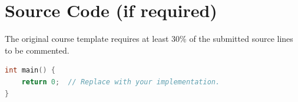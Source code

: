 \section{Source Code (if required)}

The original course template requires at least 30\% of the submitted source
lines to be commented.

% 

\begin{lstlisting}[language=C++,caption={Code example}]
int main() {
    return 0;  // Replace with your implementation.
}
\end{lstlisting}
